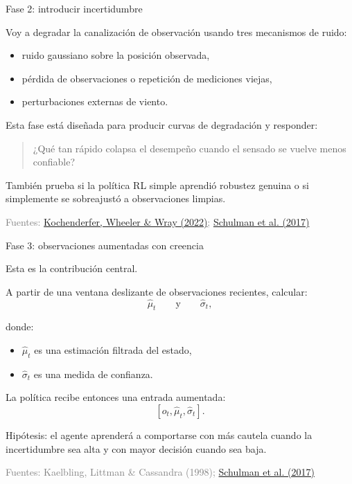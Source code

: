 \documentclass[11pt]{beamer}
\newcommand{\srcKochenderferADM}{\href{https://algorithmsbook.com}{Kochenderfer, Wheeler \& Wray (2022)}}
\newcommand{\srcKaelbling}{Kaelbling, Littman \& Cassandra (1998)}
\newcommand{\srcSchulman}{\href{https://arxiv.org/abs/1707.06347}{Schulman et al. (2017)}}
\newcommand{\SourceLine}[1]{\vfill{\tiny\textcolor{gray}{Fuentes: #1}}}
\begin{document}

\begin{frame}{Fase 2: introducir incertidumbre}

Voy a degradar la canalización de observación usando tres mecanismos de ruido:
\begin{itemize}
  \item ruido gaussiano sobre la posición observada,
  \item pérdida de observaciones o repetición de mediciones viejas,
  \item perturbaciones externas de viento.
\end{itemize}

\medskip
Esta fase está diseñada para producir curvas de degradación y responder:
\begin{quote}
¿Qué tan rápido colapsa el desempeño cuando el sensado se vuelve menos confiable?
\end{quote}

\medskip
También prueba si la política RL simple aprendió robustez genuina o si simplemente se sobreajustó a observaciones limpias.

\SourceLine{\srcKochenderferADM; \srcSchulman}
\end{frame}


\begin{frame}{Fase 3: observaciones aumentadas con creencia}

Esta es la contribución central.

\medskip
A partir de una ventana deslizante de observaciones recientes, calcular:
\[
\hat{\mu}_t \qquad \text{y} \qquad \hat{\sigma}_t,
\]

donde:
\begin{itemize}
  \item $\hat{\mu}_t$ es una estimación filtrada del estado,
  \item $\hat{\sigma}_t$ es una medida de confianza.
\end{itemize}

La política recibe entonces una entrada aumentada:
\[
[o_t, \hat{\mu}_t, \hat{\sigma}_t].
\]

Hipótesis: el agente aprenderá a comportarse con más cautela cuando la incertidumbre sea alta y con mayor decisión cuando sea baja.

\SourceLine{\srcKaelbling; \srcSchulman}
\end{frame}
\end{document}
